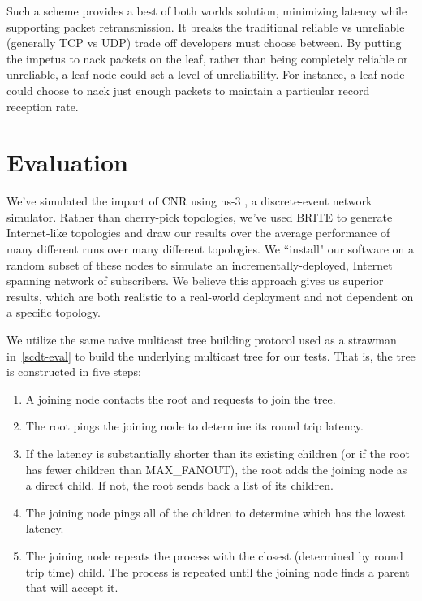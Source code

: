 Such a scheme provides a best of both worlds solution, minimizing latency while
supporting packet retransmission.  It breaks the
traditional reliable vs unreliable (generally TCP vs UDP) trade off developers
must choose between.  By putting the impetus to nack packets on the leaf, rather
than being completely reliable or unreliable, a leaf node could set a level of
unreliability.  For instance, a leaf node could choose to nack just enough
packets to maintain a particular record reception rate.


\section{Evaluation}

We've simulated the impact of CNR using ns-3 \cite{ns3}, a discrete-event network simulator. Rather than cherry-pick topologies, we've used BRITE \cite{brite} to generate Internet-like topologies and draw our results over the average performance of many different runs over many different topologies. We ``install" our software on a random subset of these nodes to simulate an incrementally-deployed, Internet spanning network of subscribers. We believe this approach gives us superior results, which are both realistic to a real-world deployment and not dependent on a specific topology. 

We utilize the same naive multicast tree building protocol used as a strawman in~\autoref{scdt-eval} to build the underlying multicast tree for our tests. That is, the tree is constructed in five steps: 

\begin{enumerate}  
	\item A joining node contacts the root and requests to join the tree. 
	\item The root pings the joining node to determine its round trip latency. 
	\item If the latency is substantially shorter than its existing children (or if the root has fewer children than MAX\_FANOUT), the root adds the joining node as a direct child. If not, the root sends back a list of its children.
	\item The joining node pings all of the children to determine which has the lowest latency.
	\item The joining node repeats the process with the closest (determined by round trip time) child. The process is repeated until the joining node finds a parent that will accept it.
\end{enumerate}

